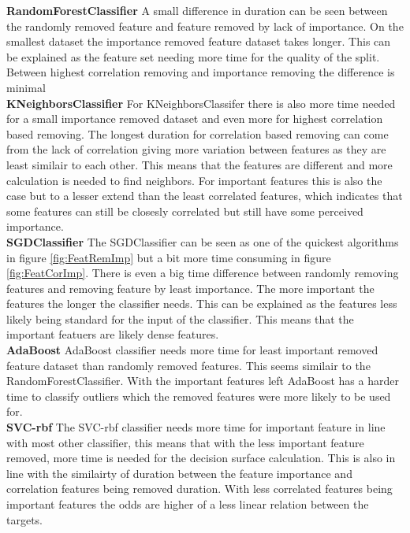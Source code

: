 \documentclass[a4paper,10pt]{article}
\begin{document}
\textbf{RandomForestClassifier} A small difference in duration can be seen between the randomly removed feature and feature removed by lack of importance. On the smallest dataset the importance removed feature dataset takes longer. This can be explained as the feature set needing more time for the quality of the split. Between highest correlation removing and importance removing the difference is minimal\\

\textbf{KNeighborsClassifier} For KNeighborsClassifer there is also more time needed for a small importance removed dataset and even more for highest correlation based removing. The longest duration for correlation based removing can come from the lack of correlation giving more variation between features as they are least similair to each other. This means that the features are different and more calculation is needed to find neighbors. For important features this is also the case but to a lesser extend than the least correlated features, which indicates that some features can still be closesly correlated but still have some perceived importance.\\

\textbf{SGDClassifier} The SGDClassifier can be seen as one of the quickest algorithms in figure \ref{fig:FeatRemImp} but a bit more time consuming in figure \ref{fig:FeatCorImp}. There is even a big time difference between randomly removing features and removing feature by least importance. The more important the features the longer the classifier needs. This can be explained as the features less likely being standard for the input of the classifier. This means that the important featuers are likely dense features. \\

\textbf{AdaBoost} AdaBoost classifier needs more time for least important removed feature dataset than randomly removed features. This seems similair to the RandomForestClassifier. With the important features left AdaBoost has a harder time to classify outliers which the removed features were more likely to be used for. \\

\textbf{SVC-rbf} The SVC-rbf classifier needs more time for important feature in line with most other classifier, this means that with the less important feature removed, more time is needed for the decision surface calculation. This is also in line with the similairty of duration between the feature importance and correlation features being removed duration. With less correlated features being important features the odds are higher of a less linear relation between the targets. \\
\end{document}
